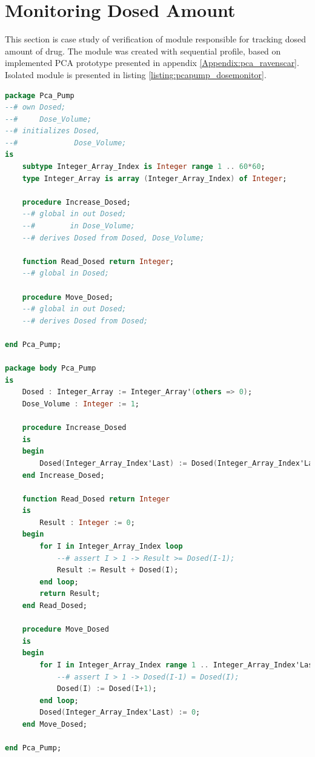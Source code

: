 \section{Monitoring Dosed Amount}
\label{verification:pcapump:monitoring}

This section is case study of verification of module responsible for tracking dosed amount of drug. The module was created with sequential profile, based on implemented PCA prototype presented in appendix \ref{Appendix:pca_ravenscar}. Isolated module is presented in listing \ref{listing:pcapump_dosemonitor}.

\singlespacing
\begin{lstlisting}[language=ada, frame=single, gobble=0, caption={Dose monitor module specification}, label={listing:pcapump_dosemonitor}]
package Pca_Pump
--# own Dosed;
--#     Dose_Volume;
--# initializes Dosed,
--#             Dose_Volume;
is
    subtype Integer_Array_Index is Integer range 1 .. 60*60;
    type Integer_Array is array (Integer_Array_Index) of Integer;

    procedure Increase_Dosed;
    --# global in out Dosed;
    --#        in Dose_Volume;
    --# derives Dosed from Dosed, Dose_Volume;

    function Read_Dosed return Integer;
    --# global in Dosed;

    procedure Move_Dosed;
    --# global in out Dosed;
    --# derives Dosed from Dosed;

end Pca_Pump;

package body Pca_Pump
is
    Dosed : Integer_Array := Integer_Array'(others => 0);
    Dose_Volume : Integer := 1;

    procedure Increase_Dosed
    is
    begin
        Dosed(Integer_Array_Index'Last) := Dosed(Integer_Array_Index'Last) + Dose_Volume;
    end Increase_Dosed;

    function Read_Dosed return Integer
    is
        Result : Integer := 0;
    begin
        for I in Integer_Array_Index loop
            --# assert I > 1 -> Result >= Dosed(I-1);
            Result := Result + Dosed(I);
        end loop;
        return Result;
    end Read_Dosed;

    procedure Move_Dosed
    is
    begin
        for I in Integer_Array_Index range 1 .. Integer_Array_Index'Last-1 loop
            --# assert I > 1 -> Dosed(I-1) = Dosed(I);
            Dosed(I) := Dosed(I+1);
        end loop;
        Dosed(Integer_Array_Index'Last) := 0;
    end Move_Dosed;

end Pca_Pump;
\end{lstlisting}
\doublespacing

